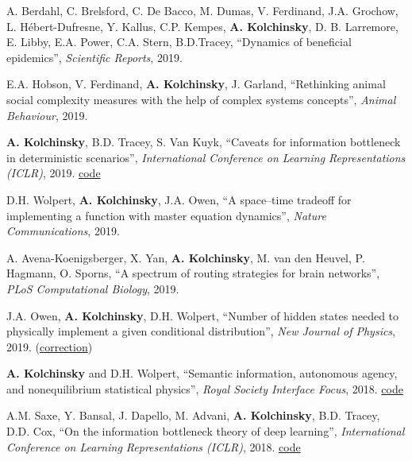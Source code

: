 A. Berdahl, C. Brelsford, C. De Bacco, M. Dumas, V. Ferdinand, J.A. Grochow, L. Hébert-Dufresne,
Y. Kallus, C.P. Kempes, \textbf{A. Kolchinsky}, D. B. Larremore,
E. Libby, E.A. Power, C.A. Stern, B.D.Tracey, ``Dynamics of beneficial epidemics'', \emph{Scientific Reports}, 2019. 

E.A. Hobson, V. Ferdinand, \textbf{A. Kolchinsky}, J. Garland, 
``Rethinking animal social complexity measures with the help of complex systems concepts'', 
\emph{Animal Behaviour}, 2019. 

\textbf{A. Kolchinsky}, B.D. Tracey, S. Van Kuyk, ``Caveats for information bottleneck in deterministic scenarios'', \emph{International Conference on Learning Representations (ICLR)}, 2019. 
\href{https://github.com/artemyk/ibcurve}{code}

D.H. Wolpert, \textbf{A. Kolchinsky}, J.A. Owen, ``A space–time tradeoff for implementing a function with master equation dynamics'', \emph{Nature Communications}, 2019. 

A. Avena-Koenigsberger, X. Yan, \textbf{A. Kolchinsky}, M. van den Heuvel, P. Hagmann, O. Sporns, 
``A spectrum of routing strategies for brain networks'', \emph{PLoS Computational Biology}, 2019. 

J.A. Owen, \textbf{A. Kolchinsky}, D.H. Wolpert, ``Number of hidden states needed to physically implement a given conditional distribution'', \emph{New Journal of Physics}, 2019. (\href{https://iopscience.iop.org/article/10.1088/1367-2630/ab60f8}{correction}) 

\textbf{A. Kolchinsky} and D.H. Wolpert, 
``Semantic information, autonomous agency, and nonequilibrium statistical physics'', 
\emph{Royal Society Interface Focus}, 2018. 
\href{https://github.com/artemyk/semantic_information/}{code}

A.M. Saxe, Y. Bansal, J. Dapello, M. Advani, \textbf{A. Kolchinsky}, B.D. Tracey, D.D. Cox, 
``On the information bottleneck theory of deep learning'', \emph{International Conference on Learning Representations (ICLR)}, 2018. 
 \href{https://github.com/artemyk/ibsgd/tree/iclr2018}{code}

